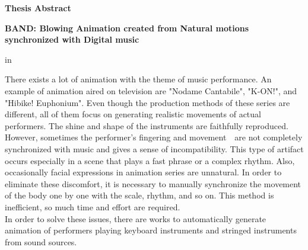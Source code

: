 \begin{center}
{\bf {\large Thesis Abstract}}

\vspace{2ex}

{\bf {\large BAND: Blowing Animation created from Natural motions synchronized with Digital music}}
\end{center}

\vspace{3ex}

 in

There exists a lot of animation with the theme of music performance.
%
An example of animation aired on television are "Nodame Cantabile", "K-ON!", and "Hibike! Euphonium".
%
Even though the production methods of these series are different, all of them focus on generating realistic movements of actual performers.
%
The shine and shape of the instruments are faithfully reproduced.
%
However, sometimes the performer's fingering and movement　are not completely synchronized with music and gives a sense of incompatibility.
%
This type of artifact occurs especially in a scene that plays a fast phrase or a complex rhythm.
%
Also, occasionally facial expressions in animation series are unnatural.
%
In order to eliminate these discomfort, 
it is necessary to manually synchronize the movement of the body one by one with the scale, rhythm, and so on.
%
This method is inefficient, so much time and effort are required.\\
\indent
%
In order to solve these issues, there are works to automatically generate animation of performers playing keyboard instruments and stringed instruments from sound sources.
